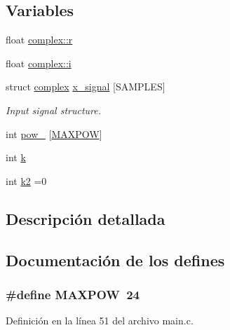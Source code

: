 \subsection*{Variables}
\begin{DoxyCompactItemize}
\item 
float \hyperlink{group___main_ga6b24d5cc84eef41dbe90b79e93de030f}{complex\+::r}
\item 
float \hyperlink{group___main_ga5eefa12b02189d694af536bc7d8726be}{complex\+::i}
\item 
struct \hyperlink{structcomplex}{complex} \hyperlink{group___main_ga50a386ea2d430e81f1bd2cbcb70eafcb}{x\+\_\+signal} \mbox{[}S\+A\+M\+P\+L\+ES\mbox{]}
\begin{DoxyCompactList}\small\item\em Input signal structure. \end{DoxyCompactList}\item 
int \hyperlink{group___main_gae6e1b2e2df50cea4a448b3e1af0ef67c}{pow\+\_} \mbox{[}\hyperlink{group___main_gaeb7ac177f98359103932539c10abf8c8}{M\+A\+X\+P\+OW}\mbox{]}
\item 
int \hyperlink{group___main_gab66ed8e0098c0a86b458672a55a9cca9}{k}
\item 
int \hyperlink{group___main_ga57d44982ba52ca6e9a95be4998e5a646}{k2} =0
\end{DoxyCompactItemize}


\subsection{Descripción detallada}


\subsection{Documentación de los \textquotesingle{}defines\textquotesingle{}}
\subsubsection[{\texorpdfstring{M\+A\+X\+P\+OW}{MAXPOW}}]{\setlength{\rightskip}{0pt plus 5cm}\#define M\+A\+X\+P\+OW~24}\hypertarget{group___main_gaeb7ac177f98359103932539c10abf8c8}{}\label{group___main_gaeb7ac177f98359103932539c10abf8c8}


Definición en la línea 51 del archivo main.\+c.



